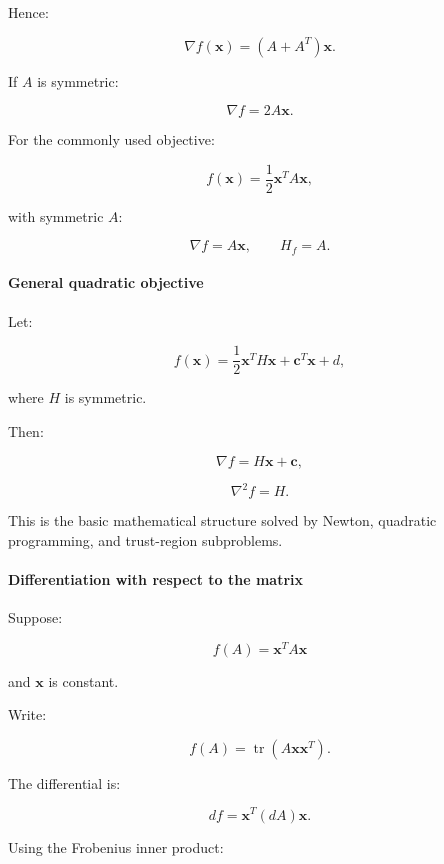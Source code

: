 Hence:

\[
\boxed{ \nabla f(\mathbf x)=(A+A^T)\mathbf x }.
\]

If \(A\) is symmetric:

\[
\boxed{ \nabla f=2A\mathbf x }.
\]

For the commonly used objective:

\[
f(\mathbf x)=\frac12\mathbf x^TA\mathbf x,
\]

with symmetric \(A\):

\[
\boxed{ \nabla f=A\mathbf x, \qquad H_f=A }.
\]

\paragraph{General quadratic objective}\label{02-foundations-ii-ch027-general-quadratic-objective}

\hypertarget{02-foundations-ii-ch027-general-quadratic-objective}{}

Let:

\[
f(\mathbf x)= \frac12\mathbf x^TH\mathbf x+ \mathbf c^T\mathbf x+d,
\]

where \(H\) is symmetric.

Then:

\[
\boxed{ \nabla f=H\mathbf x+\mathbf c },
\]

\[
\boxed{ \nabla^2f=H }.
\]

This is the basic mathematical structure solved by Newton, quadratic programming, and trust-region subproblems.

\paragraph{Differentiation with respect to the matrix}\label{02-foundations-ii-ch027-differentiation-with-respect-to-the-matrix}

\hypertarget{02-foundations-ii-ch027-differentiation-with-respect-to-the-matrix}{}

Suppose:

\[
f(A)=\mathbf x^TA\mathbf x
\]

and \(\mathbf x\) is constant.

Write:

\[
f(A)=\operatorname{tr}(A\mathbf x\mathbf x^T).
\]

The differential is:

\[
df=\mathbf x^T(dA)\mathbf x.
\]

Using the Frobenius inner product:

